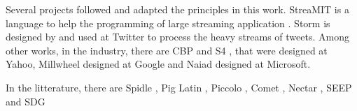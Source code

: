 Several projects followed and adapted the principles in this work.
StreaMIT is a language to help the programming of large streaming application \cite{Thies2002}.
Storm \cite{Toshniwal2014} is designed by and used at Twitter to process the heavy streams of tweets.
Among other works, in the industry, there are
CBP \cite{Logothetis2010} and
S4 \cite{Neumeyer2010}, that were designed at Yahoo,
Millwheel \cite{Akidau2013} designed at Google and
Naiad \cite{Murray2013} designed at Microsoft.

In the litterature, there are
Spidle \cite{Consel2003},
Pig Latin \cite{Olston2008},
Piccolo \cite{Power2010},
Comet \cite{He2010},
Nectar \cite{Gunda2010},
SEEP \cite{Migliavacca2010} and
SDG \cite{Fernandez2014a}








